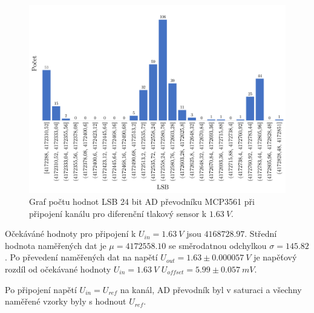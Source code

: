 \begin{figure}[H]
    \caption{Graf počtu hodnot LSB 24 bit AD převodníku MCP3561 při připojení kanálu
        pro diferenční tlakový sensor k  $1.63 \ V$.}
    \includegraphics[width=1\textwidth]{graphs/mcp_16.png}
\end{figure}
Očekáváné hodnoty pro připojení k $U_{in} = 1.63 \ V$ jsou $4168728.97$. Střední hodnota naměřených dat je $\mu = 4172558.10$ se směrodatnou odchylkou $\sigma = 145.82$. Po převedení naměřených dat na napětí $U_{out} = 1.63 \pm 0.000057\ V$ je napěťový rozdíl od očekávané hodnoty $U_{in} = 1.63 \ V$
$U_{offset} = 5.99 \pm 0.057 \ mV$.
\par
Po připojení napětí $U_{in} = U_{ref}$ na kanál, AD převodník byl v saturaci a všechny naměřené vzorky byly s hodnout $U_{ref}$.
